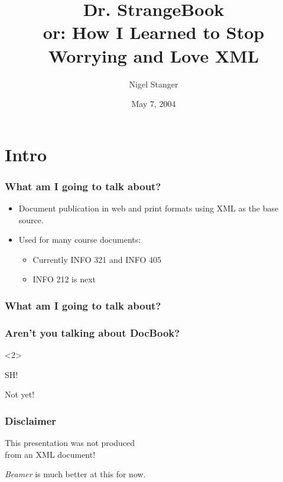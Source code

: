 \documentclass[pdftex,notes=onlyslideswithnotes]{beamer}
\author{Nigel Stanger}
\title{Dr. StrangeBook \\ \footnotesize or: How I Learned to Stop Worrying and Love XML}
\institute{Department of Information Science}
\date{May 7, 2004}
\begin{document}
\frame{\titlepage}


\section*{Intro}


\frame
{
	\frametitle{What am I going to talk about?}
	
	\begin{itemize}
	
		\item Document publication in web and print formats using XML
		as the base source.
		
		\item Used for many course documents:
		
		\begin{itemize}
		
			\item Currently INFO 321 and INFO 405
			
			\item INFO 212 is next
			
		\end{itemize}
	
	\end{itemize}
}


\frame
{
	\frametitle{What am I going to talk about?}
	
	\tableofcontents
}


\frame
{
	\frametitle{Aren't you talking about DocBook?}
	
	
	\begin{center}
	
		\begin{uncoverenv}<2>

			{\Huge\alert{SH!}}
			
			\vspace*{1cm}
		
			Not yet!
		
		\end{uncoverenv}
	
	\end{center}	
}


\frame
{
	\frametitle{Disclaimer}
	
	\begin{center}
	
		{\LARGE\alert{This presentation was not produced \\
		from an XML document!}}
		
		\vspace*{1cm}
		
		\emph{Beamer} is much better at this for now.
	
	\end{center}
}
\end{document}
